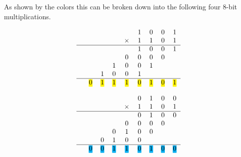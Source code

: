 \documentclass[11pt]{article}
\newcommand{\hlc}[2][yellow]{{%
    \colorlet{foo}{#1}%
    \sethlcolor{foo}\hl{#2}}%
}
\begin{document}
As shown by the colors this can be broken down into the following four 8-bit multiplications. 
\vspace{5mm}
\begin{minipage}{.5\linewidth}
    \begin{equation}
        \label{eq:yellow}
        \begin{tabular}{c c c c c c c c c }
            &   &   &   &   & 1 & 0 & 0 & 1 \\
            &   &   &   &  $\times$ & 1 & 1 & 0 & 1 \\
            \hline
            &   &   &   &   & 1 & 0 & 0 & 1 \\
            &   &   &   & 0 & 0 & 0 & 0 &   \\
            &   &   & 1 & 0 & 0 & 1 &   &   \\
            &   & 1 & 0 & 0 & 1 &   &   &   \\
            \hline
            & \hlc[yellow]{0} & \hlc[yellow]{1} & \hlc[yellow]{1} & \hlc[yellow]{1} & \hlc[yellow]{0} & \hlc[yellow]{1} & \hlc[yellow]{0} & \hlc[yellow]{1} \\
        \end{tabular} 
    \end{equation}
    \end{minipage}%
    \begin{minipage}{.5\linewidth}
        \begin{equation}
            \label{eq:blue}
            \begin{tabular}{c c c c c c c c c }
                &   &   &   &   & 0 & 1 & 0 & 0 \\
                &   &   &   &  $\times$ & 1 & 1 & 0 & 1 \\
                \hline
                &   &   &   &   & 0 & 1 & 0 & 0 \\
                &   &   &   & 0 & 0 & 0 & 0 &   \\
                &   &   & 0 & 1 & 0 & 0 &   &   \\
                &   & 0 & 1 & 0 & 0 &   &   &   \\
                \hline
                & \hlc[cyan]{0} & \hlc[cyan]{0} & \hlc[cyan]{1} & \hlc[cyan]{1} & \hlc[cyan]{0} & \hlc[cyan]{1} & \hlc[cyan]{0} & \hlc[cyan]{0} \\
            \end{tabular} 
        \end{equation}
\end{minipage}
\vspace{5mm}
\end{document}
